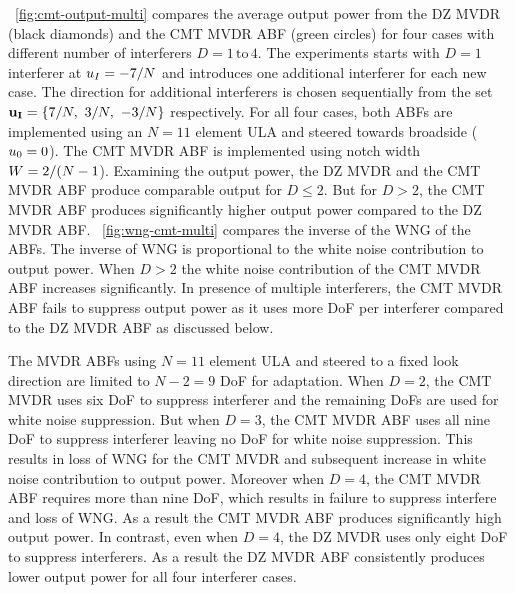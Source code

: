 
\figurename{}~\ref{fig:cmt-output-multi} compares the average output
power from the DZ MVDR (black diamonds) and the CMT MVDR ABF (green
circles) for four cases with different number of interferers
$D = 1\,\text{to}\,4$. The experiments starts with $D = 1$ interferer
at $u_I = -7/N$ and introduces one additional interferer for each
new case. The direction for additional interferers is chosen
sequentially from the set
$\mathbf{u_I} = \lbrace 7/N,~3/N,~-3/N \rbrace$ respectively. For
all four cases, both ABFs are implemented using an $N = 11$ element
ULA and steered towards broadside ($u_0 = 0$). The CMT MVDR ABF is
implemented using notch width $W = 2/(N - 1$). Examining the
output power, the DZ MVDR and the CMT MVDR ABF produce comparable
output for $ D \leq 2$. But for $D > 2$, the CMT MVDR ABF produces
significantly higher output power compared to the DZ MVDR ABF.
\figurename{}~\ref{fig:wng-cmt-multi} compares the inverse of the WNG
of the ABFs.  The inverse of WNG is proportional to the white noise
contribution to output power. When $D > 2$ the white noise
contribution of the CMT MVDR ABF increases significantly. In presence
of multiple interferers, the CMT MVDR ABF fails to suppress output
power as it uses more DoF per interferer compared to the DZ MVDR ABF
as discussed below.

The MVDR ABFs using $N = 11$ element ULA and steered to a fixed look
direction are limited to $N-2 = 9$ DoF for adaptation. When $D = 2$,
the CMT MVDR uses six DoF to suppress interferer and the remaining
DoFs are used for white noise suppression. But when $D = 3$, the CMT
MVDR ABF uses all nine DoF to suppress interferer leaving no DoF for
white noise suppression. This results in loss of WNG for the CMT MVDR
and subsequent increase in white noise contribution to output
power. Moreover when $D = 4$, the CMT MVDR ABF requires more than nine
DoF, which results in failure to suppress interfere and loss of
WNG. As a result the CMT MVDR ABF produces significantly high output
power. In contrast, even when $ D = 4$, the DZ MVDR uses only eight
DoF to suppress interferers. As a result the DZ MVDR ABF consistently
produces lower output power for all four interferer cases.

